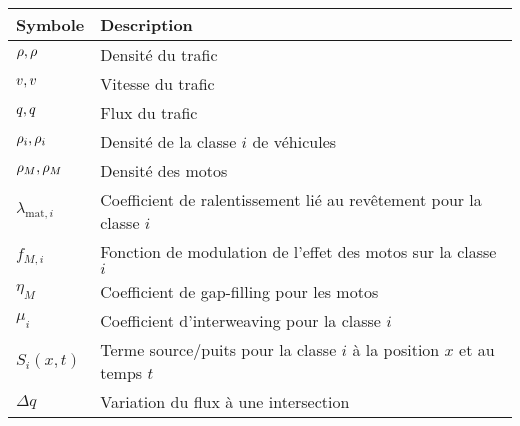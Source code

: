 \begin{tabular}{ll}
\toprule
\textbf{Symbole} & \textbf{Description} \\
\midrule
$\rho, \rho$ & Densité du trafic \\
$v, v$ & Vitesse du trafic \\
$q, q$ & Flux du trafic \\
$\rho_i, \rho_{i}$ & Densité de la classe $i$ de véhicules \\
$\rho_M, \rho_M$ & Densité des motos \\
$\lambda_{\text{mat},i}$ & Coefficient de ralentissement lié au revêtement pour la classe $i$ \\
$f_{M,i}$ & Fonction de modulation de l'effet des motos sur la classe $i$ \\
$\eta_M$ & Coefficient de gap-filling pour les motos \\
$\mu_i$ & Coefficient d'interweaving pour la classe $i$ \\
$S_i(x,t)$ & Terme source/puits pour la classe $i$ à la position $x$ et au temps $t$ \\
$\Delta q$ & Variation du flux à une intersection \\
\bottomrule
\end{tabular}
